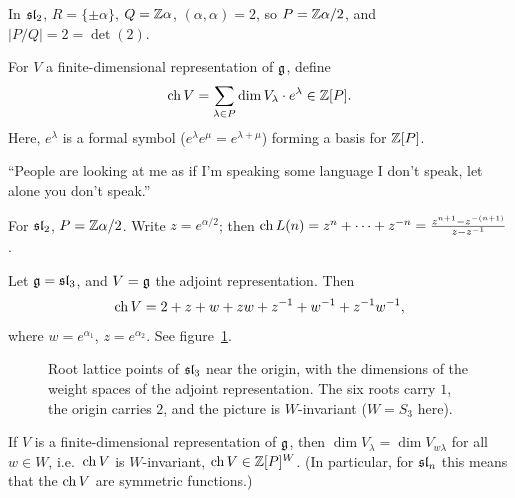 \begin{example}
In $\sl_2$, $R = \{\pm\alpha\}$, $Q = \Z\alpha$, $(\alpha, \alpha) = 2$, so
$P = \Z\alpha/2$, and $|P/Q| = 2 = \det(2)$.
\end{example}

\begin{definition}
For $V$ a finite-dimensional representation of $\g$, define
\[
  \ch V = \sum_{\lambda \in P} \dim V_\lambda \cdot e^\lambda \in \Z[P].
\]
Here, $e^\lambda$ is a formal symbol ($e^\lambda e^\mu = e^{\lambda+\mu}$)
forming a basis for $\Z[P]$.
\end{definition}

``People are looking at me as if I'm speaking some language I don't speak, let
alone you don't speak.''

\begin{example}
For $\sl_2$, $P = \Z\alpha/2$. Write $z = e^{\alpha/2}$; then
$\ch L(n) = z^n + \dots + z^{-n} = \frac{z^{n+1} - z^{-(n+1)}}{z - z^{-1}}$.
\end{example}

\begin{example}
Let $\g = \sl_3$, and $V = \g$ the adjoint representation. Then
\[
  \ch V = 2 + z + w + zw + z^{-1} + w^{-1} + z^{-1}w^{-1},
\]
where $w = e^{\alpha_1}$, $z = e^{\alpha_2}$. See figure~\ref{fig:sl3-adjoint}.
\end{example}

\begin{figure}[!htbp]
\centering
{}
\caption{Root lattice points of $\sl_3$ near the origin, with the dimensions
of the weight spaces of the adjoint representation. The six roots carry $1$,
the origin carries $2$, and the picture is $W$-invariant ($W = S_3$ here).}
\label{fig:sl3-adjoint}
\end{figure}

\begin{proposition}
If $V$ is a finite-dimensional representation of $\g$, then
$\dim V_\lambda = \dim V_{w\lambda}$ for all $w \in W$, i.e.\ $\ch V$ is
$W$-invariant, $\ch V \in \Z[P]^W$. (In particular, for $\sl_n$ this means that
the $\ch V$ are symmetric functions.)
\end{proposition}

